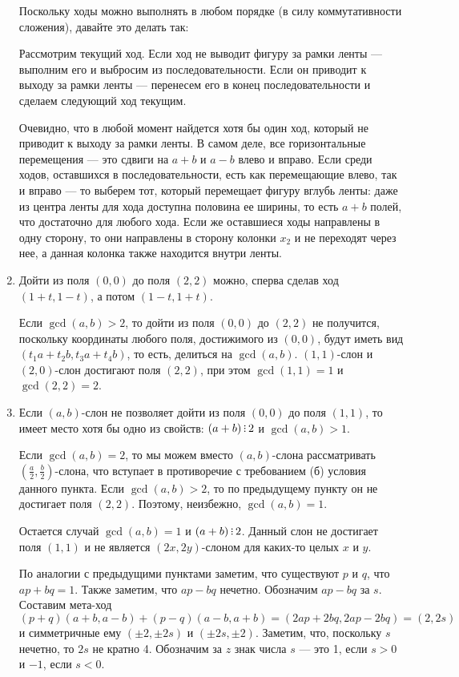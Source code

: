 \begin{enumerate}
Поскольку ходы можно выполнять в любом порядке (в силу коммутативности сложения), 
давайте это делать так:

Рассмотрим текущий ход. 
Если ход не выводит фигуру за рамки ленты --- выполним его и выбросим из
последовательности.
Если он приводит к выходу за рамки ленты ---
перенесем его в конец последовательности и сделаем следующий ход текущим.

Очевидно, что в любой момент найдется хотя бы один ход, который не приводит к
выходу за рамки ленты. 
В самом деле, все горизонтальные перемещения --- это сдвиги на $a+b$
и $a-b$ влево и вправо. Если среди ходов, оставшихся в последовательности,
есть как перемещающие влево, так и вправо --- то выберем тот, который перемещает фигуру вглубь
ленты: даже из центра ленты для хода доступна половина ее ширины, 
то есть $a+b$ полей, что достаточно для любого хода. Если же оставшиеся ходы
направлены в одну сторону, то они направлены в сторону колонки $x_2$ и не переходят
через нее, а данная колонка также находится внутри ленты.

\item Дойти из поля $(0,0)$ до поля $(2,2)$ можно, сперва сделав ход $(1+t,1-t)$, а потом $(1-t,1+t)$.

Если $\gcd(a,b) > 2$, то дойти из поля $(0,0)$ до $(2,2)$ не получится, поскольку
координаты любого поля, достижимого из $(0,0)$, будут иметь вид $(t_1a + t_2b, t_3a + t_4b)$,
то есть, делиться на $\gcd(a,b)$.
$(1,1)$-слон и $(2,0)$-слон достигают поля $(2,2)$, при этом $\gcd(1,1) = 1$ и $\gcd(2,2) = 2$.

\item Если $(a,b)$-слон не позволяет дойти из поля $(0,0)$ до поля $(1,1)$, то имеет место 
хотя бы одно из свойств: $(a+b) \divsby 2$ и $\gcd(a,b)>1$.

Если $\gcd(a,b) = 2$, то мы можем вместо $(a,b)$-слона рассматривать $(\frac{a}{2},\frac{b}{2})$-слона,
что вступает в противоречие с требованием (б) условия данного пункта.
Если $\gcd(a,b) > 2$, то по предыдущему пункту он не достигает поля $(2,2)$. Поэтому, неизбежно,
$\gcd(a,b) = 1$.

Остается случай $\gcd(a,b) = 1$ и $(a+b) \divsby 2$. Данный слон не достигает 
поля $(1,1)$ и не является $(2x,2y)$-слоном для каких-то целых $x$ и $y$.

По аналогии с предыдущими пунктами заметим, что существуют $p$ и $q$, что 
$ap+bq = 1$. Также заметим, что $ap-bq$ нечетно. Обозначим $ap-bq$ за $s$.
Составим мета-ход $$(p+q)(a+b,a-b) + (p-q)(a-b,a+b) = (2ap+2bq,2ap-2bq) = (2,2s)$$
и симметричные ему $(\pm 2, \pm 2s)$ и $(\pm 2s,\pm 2)$.
Заметим, что, поскольку $s$ нечетно, то $2s$ не кратно 4. Обозначим за $z$ знак числа $s$ ---
это 1, если $s > 0$ и $-1$, если $s < 0$.


\end{enumerate}
